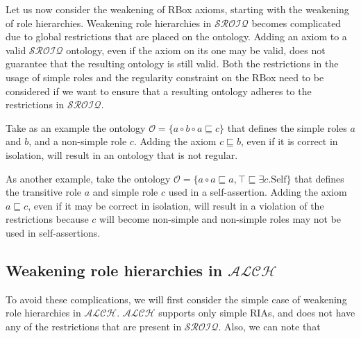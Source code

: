 Let us now consider the weakening of RBox axioms, starting with the weakening of role hierarchies. Weakening role hierarchies in $\mathcal{SROIQ}$ becomes complicated due to global restrictions that are placed on the ontology. Adding an axiom to a valid $\mathcal{SROIQ}$ ontology, even if the axiom on its one may be valid, does not guarantee that the resulting ontology is still valid. Both the restrictions in the usage of simple roles and the regularity constraint on the RBox need to be considered if we want to ensure that a resulting ontology adheres to the restrictions in $\mathcal{SROIQ}$.

\begin{example}
Take as an example the ontology $\mathcal{O} = \{a \circ b \circ a \sqsubseteq c\}$ that defines the simple roles $a$ and $b$, and a non-simple role $c$. Adding the axiom $c \sqsubseteq b$, even if it is correct in isolation, will result in an ontology that is not regular.
\end{example}

\begin{example}
As another example, take the ontology $\mathcal{O} = \{a \circ a \sqsubseteq a, \top \sqsubseteq \exists c . \mathrm{Self} \}$ that defines the transitive role $a$ and simple role $c$ used in a self-assertion. Adding the axiom $a \sqsubseteq c$, even if it may be correct in isolation, will result in a violation of the restrictions because $c$ will become non-simple and non-simple roles may not be used in self-assertions.
\end{example}

\subsection{Weakening role hierarchies in $\mathcal{ALCH}$} \label{weakening-role-hierarchies-in-mathcal-alch-}

To avoid these complications, we will first consider the simple case of weakening role hierarchies in $\mathcal{ALCH}$. $\mathcal{ALCH}$ supports only simple RIAs, and does not have any of the restrictions that are present in $\mathcal{SROIQ}$. Also, we can note that

